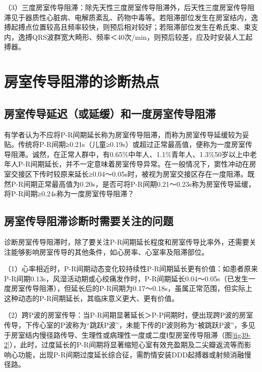 （3）三度房室传导阻滞：除先天性三度房室传导阻滞外，后天性三度房室传导阻滞见于器质性心脏病、电解质紊乱、药物中毒等。若阻滞部位发生在房室结内，逸搏起搏点位置较高且频率较快，则预后相对较好；若阻滞部位发生在希氏束、束支内，逸搏QRS波群宽大畸形、频率＜40次/min，则预后较差，应及时安装人工起搏器。

\protect\hypertarget{text00027.htmlux5cux23subid332}{}{}

\section{房室传导阻滞的诊断热点}

\protect\hypertarget{text00027.htmlux5cux23subid333}{}{}

\subsection{房室传导延迟（或延缓）和一度房室传导阻滞}

有学者认为不应将P-R间期延长称为房室传导阻滞，而称为房室传导延缓较为妥贴。传统将P-R间期≥0.21s（儿童≥0.19s）或超过正常最高值，便称为一度房室传导阻滞。诚然，在正常人群中，有0.65\%中年人、1.1\%青年人、1.3\%50岁以上中老年人P-R间期延长，并不一定意味着房室传导异常。在一般情况下，窦性冲动在房室交接区下传时较原来延长≥0.04～0.05s时，被视为房室交接区存在一度阻滞。既然P-R间期正常最高值为0.20s，是否可将P-R间期0.21～0.23s称为房室传导延缓，将P-R间期≥0.24s称为一度房室传导阻滞？

\protect\hypertarget{text00027.htmlux5cux23subid334}{}{}

\subsection{房室传导阻滞诊断时需要关注的问题}

诊断房室传导阻滞时，除了要关注P-R间期延长程度和房室传导比率外，还需要关注能够影响房室传导的其他条件，如心房率、心室率及阻滞部位。

（1）心率相近时，P-R间期动态变化较持续性P-R间期延长更有价值：如患者原来P-R间期0.13s，风湿活动期或心绞痛发作时，P-R间期延长0.04～0.05s（已发生一度房室传导阻滞），但延长后的P-R间期为0.17～0.18s，虽属正常范围，但实际上这种动态的P-R间期延长，其临床意义更大、更有价值。

（2）跨P波的房室传导：当P-R间期显著延长＞P-P间期时，便出现跨P波的房室传导，下传心室的P波称为“跳跃P波”，未能下传的P波则称为“被跳跃P波”，多见于房室结内慢径路传导、生理性或病理性一度或二度Ⅰ型房室传导阻滞（图\ref{fig39-2}），此时，过度延长的P-R间期将显著缩短心室有效充盈期及二尖瓣返流等而影响心功能，出现P-R间期过度延长综合征，需酌情安装DDD起搏器或射频消融慢径路。

